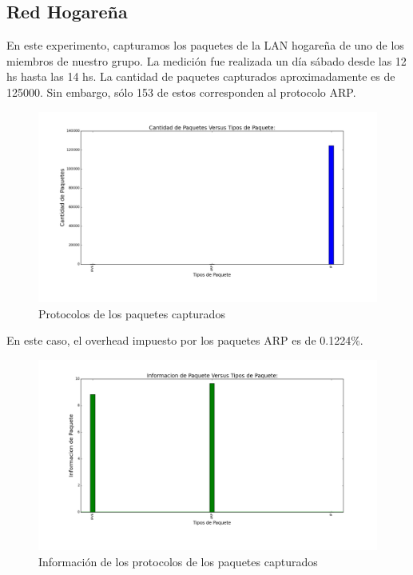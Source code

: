 \subsection{Red Hogareña}

En este experimento, capturamos los paquetes de la LAN hogareña de uno de los miembros de nuestro grupo. La medición fue realizada un día sábado desde las 12 hs hasta las 14 hs. La cantidad de paquetes capturados aproximadamente es de 125000. Sin embargo, sólo 153 de estos corresponden al protocolo ARP.

\begin{figure}[H]
       \centering
       \includegraphics[width=1\textwidth]{../resultados/Casa/histogram_types.png}
       \caption{Protocolos de los paquetes capturados}
       \label{red-hogarena-types}
\end{figure}

En este caso, el overhead impuesto por los paquetes ARP es de 0.1224\%.

\begin{figure}[H]
       \centering
       \includegraphics[width=1\textwidth]{../resultados/Casa/histogram_types_information.png}
       \caption{Información de los protocolos de los paquetes capturados}
       \label{red-hogarena-types-info}
\end{figure}

